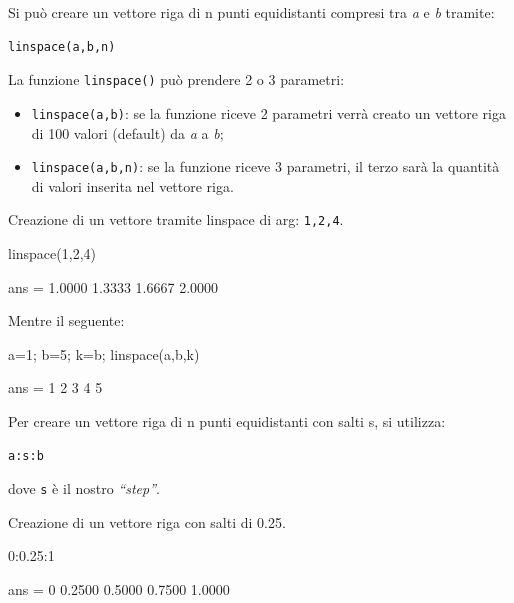 Si può creare un vettore riga di n punti equidistanti compresi tra \emph{a} e \emph{b} tramite:
\begin{verbatim}
linspace(a,b,n)
\end{verbatim}
La funzione \verb|linspace()| può prendere 2 o 3 parametri:
\begin{itemize}
    \item \verb|linspace(a,b)|: se la funzione riceve 2 parametri verrà creato un vettore riga di 100 valori (default) da \emph{a} a \emph{b};
    \item \verb|linspace(a,b,n)|: se la funzione riceve 3 parametri, il terzo sarà la quantità di valori inserita nel vettore riga.
\end{itemize}

\begin{example}
    Creazione di un vettore tramite linspace di arg: \verb|1,2,4|.
\end{example}
\begin{matlab}
    linspace(1,2,4)
\end{matlab}
\begin{matlabconsole}
    ans =
    1.0000  1.3333  1.6667  2.0000
\end{matlabconsole}

\bigskip
Mentre il seguente:
\begin{matlab}
    a=1;
    b=5;
    k=b;
    linspace(a,b,k)
\end{matlab}
\begin{matlabconsole}
    ans =
    1   2   3   4   5
\end{matlabconsole}

\bigskip
Per creare un vettore riga di n punti equidistanti con salti s, si utilizza:
\begin{verbatim}
a:s:b
\end{verbatim}
dove \verb|s| è il nostro \emph{``step''}.
\begin{example}
    Creazione di un vettore riga con salti di 0.25.
\end{example}
\begin{matlab}
    0:0.25:1
\end{matlab}
\begin{matlabconsole}
    ans =
    0   0.2500  0.5000  0.7500  1.0000
\end{matlabconsole}

